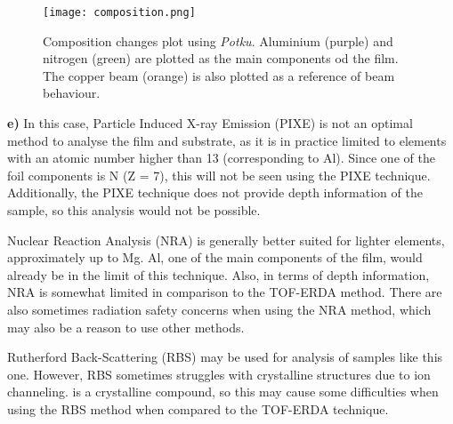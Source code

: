 \begin{figure}[t]
    \centering
    \texttt{[image: composition.png]}
    \caption{Composition changes plot using \textit{Potku}. Aluminium (purple) and nitrogen (green) are plotted as the main components od the film. The copper beam (orange) is also plotted as a reference of beam behaviour.}
    \label{fig:composition}
\end{figure}

\textbf{e)} In this case, Particle Induced X-ray Emission (PIXE) is not an optimal method to analyse the film and substrate, as it is in practice limited to elements with an atomic number higher than 13 (corresponding to Al). Since one of the foil components is N (Z = 7), this will not be seen using the PIXE technique. Additionally, the PIXE technique does not provide depth information of the sample, so this analysis would not be possible.

Nuclear Reaction Analysis (NRA) is generally better suited for lighter elements, approximately up to Mg. Al, one of the main components of the film, would already be in the limit of this technique. Also, in terms of depth information, NRA is somewhat limited in comparison to the TOF-ERDA method. There are also sometimes radiation safety concerns when using the NRA method, which may also be a reason to use other methods.

Rutherford Back-Scattering (RBS) may be used for analysis of samples like this one. However, RBS sometimes struggles with crystalline structures due to ion channeling.  is a crystalline compound, so this may cause some difficulties when using the RBS method when compared to the TOF-ERDA technique.



